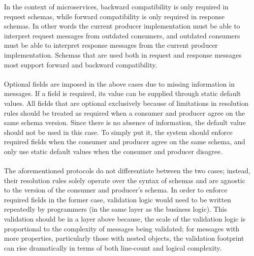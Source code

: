 In the context of microservices, backward compatibility is only required in request schemas, while forward compatibility is only required in response schemas.
In other words the current producer implementation must be able to interpret request messages from outdated consumers, and outdated consumers
must be able to interpret response messages from the current producer implementation.
Schemas that are used both in request and response messages most support forward and backward compatibility.

\paragraph{}

Optional fields are imposed in the above cases due to missing information in messages.
If a field is required, its value can be supplied through static default values.
All fields that are optional exclusively because of limitations in resolution rules should be treated as required when a consumer and producer agree on the same schema version.
Since there is no absence of information, the default value should not be used in this case.
To simply put it, the system should enforce required fields when the consumer and producer agree on the same schema, and only use static default values when the consumer and producer disagree.

\paragraph{}

The aforementioned protocols do not differentiate between the two cases; instead, their resolution rules solely operate over the syntax of schemas and are agnostic to the version of the consumer and producer's schema.
In order to enforce required fields in the former case,
validation logic would need to be written repeatedly by programmers (in the same layer as the business logic).
This validation should be in a layer above because, the scale of the validation logic is proportional to the complexity of messages being validated;
for messages with more properties, particularly those with nested objects, the validation footprint can rise dramatically in terms of both line-count and logical complexity.

\paragraph{}

